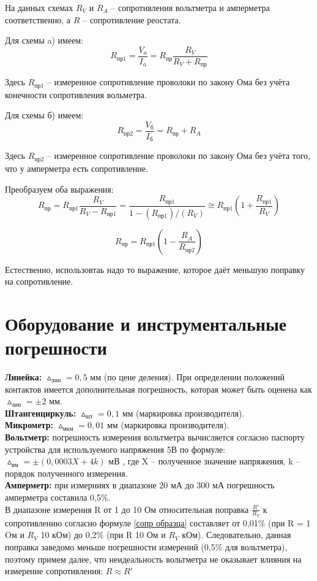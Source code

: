 На данных схемах $R_V$ и $R_A$ -- сопротивления вольтметра и амперметра соответственно, а $R$ -- сопротивление реостата.

Для схемы a) имеем:
\[R_{\text{пр1}} = \frac{V_a}{I_a} = R_{\text{пр}} \frac{R_V}{R_V + R_{\text{пр}}} \]

Здесь $R_{\text{пр1}}$ -- измеренное сопротивление проволоки по закону Ома без учёта конечности сопротивления вольметра.

Для схемы б) имеем:
\[R_{\text{пр2}} = \frac{V_{\text{б}}}{I_{\text{б}}} = R_{\text{пр}} + R_A\]

Здесь $R_{\text{пр2}}$ -- измеренное сопротивление проволоки по закону Ома без учёта того, что у амперметра есть сопротивление.

Преобразуем оба выражения:
\[R_{\text{пр}} = R_{\text{пр1}} \frac{R_V}{R_V - R_{\text{пр1}}} = \frac{R_{\text{пр1}}}{1 - (R_{\text{пр1}})/(R_V)} \cong R_{\text{пр1}} (1 + \frac{R_{\text{пр1}}}{R_V})\]

\[R_{\text{пр}} = R_{\text{пр1}} (1 - \frac{R_A}{R_{\text{пр2}}})\]

Естественно, использовтаь надо то выражение, которое даёт меньшую поправку на сопротивление.\\

\section {Оборудование и инструментальные погрешности}


\textbf{Линейка:} $\vartriangle_{лин} = 0,5$ мм (по цене деления). При определении положений контактов имеется дополнительная погрешность, которая может быть оценена как  $\vartriangle_{лин} = \pm2$ мм.\\
\textbf{Штангенциркуль:} $\vartriangle_{шт} = 0,1$ мм (маркировка производителя).\\
\textbf{Микрометр:} $\vartriangle_{мкм} = 0,01$ мм (маркировка производителя).\\
\textbf{Вольтметр:} погрешность измерения вольтметра вычисляется согласно паспорту устройства для используемого напряжения 5В по формуле: $\vartriangle_{вм} = \pm(0,0003 X + 4 k)$ мВ , где X -- полученное значение напряжения, k -- порядок полученного измерения.\\
\textbf{Амперметр:} при измерниях в диапазоне 20 мА до 300 мА погрешность амперметра составила 0,5\%. \\


В диапазоне измерения R от 1 до 10 Ом относительная поправка $\frac{R'}{R_{V}}$ к сопротивлению согласно формуле \eqref{сопр образца} составляет от 0,01\% (при R = 1 Oм и $R_{V}$ 10 кОм) до 0,2\% (при R 10 Ом и
$R_{V}$ кОм). Следовательно, данная поправка заведомо меньше погрешности измерений (0,5\% для вольтметра), поэтому примем далее, что неидеальность вольтметра не оказывает влияния на измерение сопротивления:   $R \approx R'$\\


